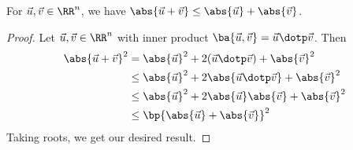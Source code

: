 \begin{corollary}
    For $\vec u, \vec v \in \RR^n$, we have $\abs{\vec u + \vec v} \leq \abs{\vec u} + \abs{\vec v}$.
\end{corollary}
\begin{proof}
    Let $\vec u, \vec v \in \RR^n$ with inner product $\ba{\vec u, \vec v} = \vec u \dotp \vec v$. Then
    \begin{align*}
        \abs{\vec u + \vec v}^2 &= \abs{\vec u}^2 + 2(\vec u \dotp \vec v) + \abs{\vec v}^2\\
        &\leq \abs{\vec u}^2 + 2\abs{\vec u \dotp \vec v} + \abs{\vec v}^2\\
        &\leq \abs{\vec u}^2 + 2\abs{\vec u}\abs{\vec v} + \abs{\vec v}^2\\
        &\leq \bp{\abs{\vec u} + \abs{\vec v}}^2
    \end{align*}
    Taking roots, we get our desired result.
\end{proof}